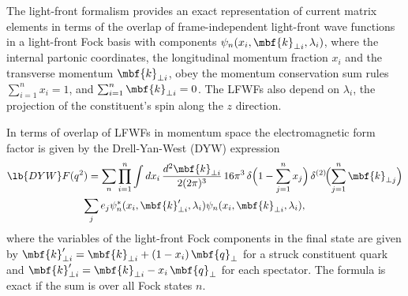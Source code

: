 \documentclass[aps,prd,preprint,groupedaddress]{revtex4-1}
\begin{document}
The light-front formalism provides an exact  representation of current  matrix elements in terms of the overlap of frame-independent light-front wave functions in a light-front Fock basis with components $\psi_n(x_i, \mbf{k}_{\perp i},\lambda_i)$, where the internal partonic coordinates, the longitudinal momentum fraction $x_i$ and the transverse momentum $\mbf{k}_{\perp i}$, obey the momentum conservation sum rules $\sum_{i=1}^n x_i =1$, and $\sum_{i=1}^n \mbf{k}_{\perp i}=0$. The LFWFs also depend on  $\lambda_i$, the projection of the constituent's spin along the $z$ direction. 


In terms of overlap of LFWFs in momentum space the electromagnetic form factor is given by the Drell-Yan-West (DYW) expression~\cite{Drell:1969km, West:1970av} 
 \begin{multline} \lb{DYW}
F(q^2) =  \sum_n  \prod_{i=1}^n \int 
dx_i \, \frac{d^2 \mbf{k}_{\perp i}}{2 (2\pi)^3} \, 16 \pi^3 \,
\delta \Bigl(1 - \sum_{j=1}^n x_j\Bigr) \, \delta^{(2)} \negthinspace\Bigl(\sum_{j=1}^n\mbf{k}_{\perp j}\Bigr) \\
\sum_j e_j \psi^*_n (x_i, \mbf{k}'_{\perp i},\lambda_i) 
\psi_n (x_i, \mbf{k}_{\perp i},\lambda_i),  \hspace{20pt}
\end{multline}
where  the variables of the light-front  Fock components in the final state are given by $\mbf{k}'_{\perp i} = \mbf{k}_{\perp i} + (1 - x_i)\, \mbf{q}_\perp $ for a struck  constituent quark and $\mbf{k}'_{\perp i} = \mbf{k}_{\perp i} - x_i \, \mbf{q}_\perp$ for each spectator. The formula is exact if the sum is over all Fock states $n$. 
\end{document}
